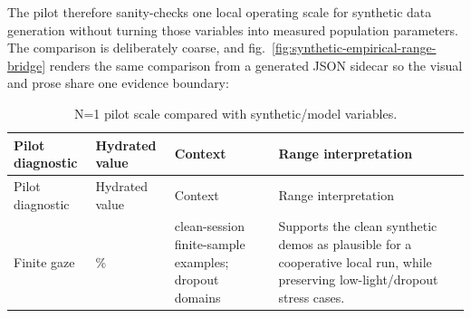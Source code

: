 \documentclass[
]{article}
\begin{document}
The pilot therefore sanity-checks one local operating scale for
synthetic data generation without turning those variables into measured
population parameters. The comparison is deliberately coarse, and
fig.~\ref{fig:synthetic-empirical-range-bridge} renders the same
comparison from a generated JSON sidecar so the visual and prose share
one evidence boundary:

\begin{longtable}[]{@{}
  >{\raggedright\arraybackslash}p{}
  >{\raggedleft\arraybackslash}p{}
  >{\raggedright\arraybackslash}p{}
  >{\raggedright\arraybackslash}p{}@{}}
\caption{N=1 pilot scale compared with synthetic/model
variables.}\label{tbl:empirical-synthetic-range}\tabularnewline
\toprule\noalign{}
\begin{minipage}[b]{\linewidth}\raggedright
Pilot diagnostic
\end{minipage} & \begin{minipage}[b]{\linewidth}\raggedleft
Hydrated value
\end{minipage} & \begin{minipage}[b]{\linewidth}\raggedright
Context
\end{minipage} & \begin{minipage}[b]{\linewidth}\raggedright
Range interpretation
\end{minipage} \\
\midrule\noalign{}
\endfirsthead
\toprule\noalign{}
\begin{minipage}[b]{\linewidth}\raggedright
Pilot diagnostic
\end{minipage} & \begin{minipage}[b]{\linewidth}\raggedleft
Hydrated value
\end{minipage} & \begin{minipage}[b]{\linewidth}\raggedright
Context
\end{minipage} & \begin{minipage}[b]{\linewidth}\raggedright
Range interpretation
\end{minipage} \\
\midrule\noalign{}
\endhead
\bottomrule\noalign{}
\endlastfoot
Finite gaze & 100.0\% & clean-session finite-sample examples; dropout
domains & Supports the clean synthetic demos as plausible for a
cooperative local run, while preserving low-light/dropout stress
cases. \\

\end{longtable}
\end{document}
